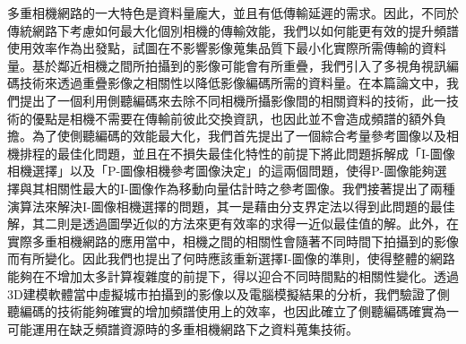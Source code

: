 多重相機網路的一大特色是資料量龐大，並且有低傳輸延遲的需求。因此，不同於傳統網路下考慮如何最大化個別相機的傳輸效能，我們以如何能更有效的提升頻譜使用效率作為出發點，試圖在不影響影像蒐集品質下最小化實際所需傳輸的資料量。基於鄰近相機之間所拍攝到的影像可能會有所重疊，我們引入了多視角視訊編碼技術來透過重疊影像之相關性以降低影像編碼所需的資料量。在本篇論文中，我們提出了一個利用側聽編碼來去除不同相機所攝影像間的相關資料的技術，此一技術的優點是相機不需要在傳輸前彼此交換資訊，也因此並不會造成頻譜的額外負擔。為了使側聽編碼的效能最大化，我們首先提出了一個綜合考量參考圖像以及相機排程的最佳化問題，並且在不損失最佳化特性的前提下將此問題拆解成「I-圖像相機選擇」以及「P-圖像相機參考圖像決定」的這兩個問題，使得P-圖像能夠選擇與其相關性最大的I-圖像作為移動向量估計時之參考圖像。我們接著提出了兩種演算法來解決I-圖像相機選擇的問題，其一是藉由分支界定法以得到此問題的最佳解，其二則是透過圖學近似的方法來更有效率的求得一近似最佳值的解。此外，在實際多重相機網路的應用當中，相機之間的相關性會隨著不同時間下拍攝到的影像而有所變化。因此我們也提出了何時應該重新選擇I-圖像的準則，使得整體的網路能夠在不增加太多計算複雜度的前提下，得以迎合不同時間點的相關性變化。透過3D建模軟體當中虛擬城市拍攝到的影像以及電腦模擬結果的分析，我們驗證了側聽編碼的技術能夠確實的增加頻譜使用上的效率，也因此確立了側聽編碼確實為一可能運用在缺乏頻譜資源時的多重相機網路下之資料蒐集技術。